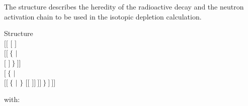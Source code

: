 The structure  describes the heredity of the radioactive decay
and the neutron activation chain to be used in the isotopic depletion
calculation.
\begin{DataStructure}{Structure }
 \\
$[[$  $[$  $]$ \\
\hskip 1.0cm $[[~\{$   $|$ \\
\hskip 2.0cm  $[$  $]~\}~]]$ \\
\hskip 1.0cm $[~\{$  $|$ \\
\hskip 2.0cm  $[[~\{$  $|$  $\}$
$[[$   $]]~]]~\}~]~]]$\\
\end{DataStructure}

\noindent
with:

